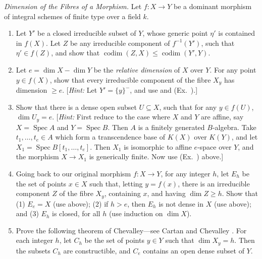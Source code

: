 {{\begin{description}[leftmargin=2.4em,labelindent=0pt,topsep=4pt,itemsep=4pt,parsep=0pt]
\item[\hypertarget{ex-II-3.22}{}\textbf{*3.22.}] \emph{Dimension of the Fibres of a Morphism.} Let $f\colon X\to Y$ be a dominant morphism of integral schemes of finite type over a field $k$.
\begin{enumerate}[label=(\alph*),leftmargin=1.6em,nosep]
\item[\hypertarget{ex-II-3.22a}{}(a)] Let $Y'$ be a closed irreducible subset of $Y$, whose generic point $\eta'$ is contained in $f(X)$. Let $Z$ be any irreducible component of $f^{-1}(Y')$, such that $\eta'\in f(Z)$, and show that $\operatorname{codim}(Z,X)\leqslant\operatorname{codim}(Y',Y)$.
\item[\hypertarget{ex-II-3.22b}{}(b)] Let $e=\dim X-\dim Y$ be the \emph{relative dimension} of $X$ over $Y$. For any point $y\in f(X)$, show that every irreducible component of the fibre $X_y$ has dimension $\geqslant e$. [\emph{Hint:} Let $Y'=\{y\}^{-}$, and use  and (Ex.~).]
\item[\hypertarget{ex-II-3.22c}{}(c)] Show that there is a dense open subset $U\subseteq X$, such that for any $y\in f(U)$, $\dim U_y=e$. [\emph{Hint:} First reduce to the case where $X$ and $Y$ are affine, say $X=\operatorname{Spec}A$ and $Y=\operatorname{Spec}B$. Then $A$ is a finitely generated $B$-algebra. Take $t_1,\ldots,t_e\in A$ which form a transcendence base of $K(X)$ over $K(Y)$, and let $X_1=\operatorname{Spec}B[t_1,\ldots,t_e]$. Then $X_1$ is isomorphic to affine $e$-space over $Y$, and the morphism $X\to X_1$ is generically finite. Now use (Ex.~) above.]
\item[(d)] Going back to our original morphism $f\colon X\to Y$, for any integer $h$, let $E_h$ be the set of points $x\in X$ such that, letting $y=f(x)$, there is an irreducible component $Z$ of the fibre $X_y$, containing $x$, and having $\dim Z\geqslant h$. Show that (1) $E_e=X$ (use  above); (2) if $h>e$, then $E_h$ is not dense in $X$ (use  above); and (3) $E_h$ is closed, for all $h$ (use induction on $\dim X$).
\item[(e)] Prove the following theorem of Chevalley---see Cartan and Chevalley . For each integer $h$, let $C_h$ be the set of points $y\in Y$ such that $\dim X_y=h$. Then the subsets $C_h$ are constructible, and $C_e$ contains an open dense subset of $Y$.
\end{enumerate}


\end{description}}}
